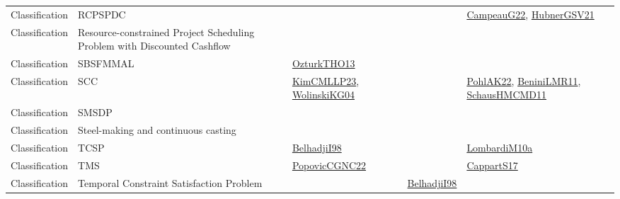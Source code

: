 {\begin{longtable}{lp{3cm}>{\raggedright}p{6cm}>{\raggedright}p{6cm}p{8cm}}
Classification & RCPSPDC &  &  & \href{articles/CampeauG22.pdf}{CampeauG22}\cite{CampeauG22}, \href{articles/HubnerGSV21.pdf}{HubnerGSV21}\cite{HubnerGSV21}\\
Classification & Resource-constrained Project Scheduling Problem with Discounted Cashflow &  &  & \\
Classification & SBSFMMAL & \href{articles/OzturkTHO13.pdf}{OzturkTHO13}\cite{OzturkTHO13} &  & \\
Classification & SCC & \href{papers/KimCMLLP23.pdf}{KimCMLLP23}\cite{KimCMLLP23}, \href{papers/WolinskiKG04.pdf}{WolinskiKG04}\cite{WolinskiKG04} &  & \href{articles/PohlAK22.pdf}{PohlAK22}\cite{PohlAK22}, \href{articles/BeniniLMR11.pdf}{BeniniLMR11}\cite{BeniniLMR11}, \href{articles/SchausHMCMD11.pdf}{SchausHMCMD11}\cite{SchausHMCMD11}\\
Classification & SMSDP &  &  & \\
Classification & Steel-making and continuous casting &  &  & \\
Classification & TCSP & \href{articles/BelhadjiI98.pdf}{BelhadjiI98}\cite{BelhadjiI98} &  & \href{articles/LombardiM10a.pdf}{LombardiM10a}\cite{LombardiM10a}\\
Classification & TMS & \href{papers/PopovicCGNC22.pdf}{PopovicCGNC22}\cite{PopovicCGNC22} &  & \href{papers/CappartS17.pdf}{CappartS17}\cite{CappartS17}\\
Classification & Temporal Constraint Satisfaction Problem &  & \href{articles/BelhadjiI98.pdf}{BelhadjiI98}\cite{BelhadjiI98} & \\

\end{longtable}}
